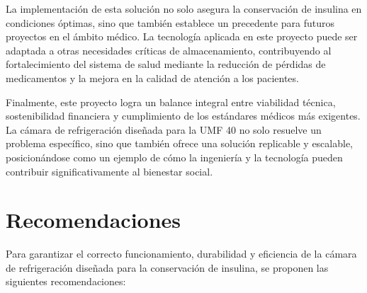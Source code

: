   La implementación de esta solución no solo asegura la conservación de insulina en condiciones óptimas, sino que también establece un precedente para futuros proyectos en el ámbito médico. La tecnología aplicada en este proyecto puede ser adaptada a otras necesidades críticas de almacenamiento, contribuyendo al fortalecimiento del sistema de salud mediante la reducción de pérdidas de medicamentos y la mejora en la calidad de atención a los pacientes.
  
 Finalmente, este proyecto logra un balance integral entre viabilidad técnica, sostenibilidad financiera y cumplimiento de los estándares médicos más exigentes. La cámara de refrigeración diseñada para la UMF 40 no solo resuelve un problema específico, sino que también ofrece una solución replicable y escalable, posicionándose como un ejemplo de cómo la ingeniería y la tecnología pueden contribuir significativamente al bienestar social.
  
  
  \section{Recomendaciones}
  Para garantizar el correcto funcionamiento, durabilidad y eficiencia de la cámara de refrigeración diseñada para la conservación de insulina, se proponen las siguientes recomendaciones:
  
